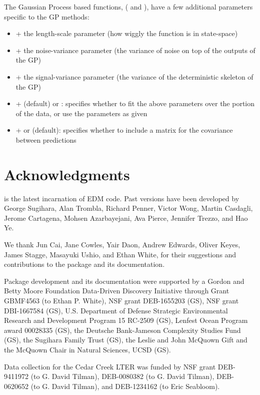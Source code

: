 \documentclass[article]{jss}
\begin{document}
The Gaussian Process based functions, ( and ), have a few additional parameters specific to the GP methods:

\begin{itemize}
\item {}
  + the length-scale parameter (how wiggly the function is in state-space)
\item {}
  + the noise-variance parameter (the variance of noise on top of the outputs of the GP)
\item {}
  + the signal-variance parameter (the variance of the deterministic skeleton of the GP)
\item {}
  +  (default) or : specifies whether to fit the above parameters over the  portion of the data, or use the parameters as given
\item {}
  +  or  (default): specifies whether to include a matrix for the covariance between predictions
\end{itemize}

\section{Acknowledgments}\label{sec:acknowledgments}

 is the latest incarnation of EDM code. Past versions have been developed by George Sugihara, Alan Trombla, Richard Penner, Victor Wong, Martin Casdagli, Jerome Cartagena, Mohsen Azarbayejani, Ava Pierce, Jennifer Trezzo, and Hao Ye.

We thank Jun Cai, Jane Cowles, Yair Daon, Andrew Edwards, Oliver Keyes, James Stagge, Masayuki Ushio, and Ethan White, for their suggestions and contributions to the package and its documentation.

Package development and its documentation were supported by a Gordon and Betty Moore Foundation Data-Driven Discovery Initiative through Grant GBMF4563 (to Ethan P. White), NSF grant DEB-1655203 (GS), NSF grant DBI-1667584 (GS), U.S. Department of Defense Strategic Environmental Research and Development Program 15 RC-2509 (GS), Lenfest Ocean Program award 00028335 (GS), the Deutsche Bank-Jameson Complexity Studies Fund (GS), the Sugihara Family Trust (GS), the Leslie and John McQuown Gift and the McQuown Chair in Natural Sciences, UCSD (GS).

Data collection for the Cedar Creek LTER was funded by NSF grant DEB-9411972 (to G. David Tilman), DEB-0080382 (to G. David Tilman), DEB-0620652 (to G. David Tilman), and DEB-1234162 (to Eric Seabloom).
\end{document}
